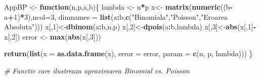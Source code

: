 \documentclass[]{article}
\newenvironment{Shaded}{\begin{snugshade}}{\end{snugshade}}
\newcommand{\KeywordTok}[1]{\textcolor[rgb]{0.13,0.29,0.53}{\textbf{#1}}}
\newcommand{\DataTypeTok}[1]{\textcolor[rgb]{0.13,0.29,0.53}{#1}}
\newcommand{\DecValTok}[1]{\textcolor[rgb]{0.00,0.00,0.81}{#1}}
\newcommand{\StringTok}[1]{\textcolor[rgb]{0.31,0.60,0.02}{#1}}
\newcommand{\CommentTok}[1]{\textcolor[rgb]{0.56,0.35,0.01}{\textit{#1}}}
\newcommand{\ControlFlowTok}[1]{\textcolor[rgb]{0.13,0.29,0.53}{\textbf{#1}}}
\newcommand{\OperatorTok}[1]{\textcolor[rgb]{0.81,0.36,0.00}{\textbf{#1}}}
\newcommand{\NormalTok}[1]{#1}
\begin{document}
\begin{Shaded}
\begin{Highlighting}[]
\NormalTok{AppBP <-}\StringTok{ }\ControlFlowTok{function}\NormalTok{(n,p,a,b)\{}
\NormalTok{    lambda <-}\StringTok{ }\NormalTok{n}\OperatorTok{*}\NormalTok{p}
\NormalTok{    x<-}\StringTok{ }\KeywordTok{matrix}\NormalTok{(}\KeywordTok{numeric}\NormalTok{((b}\OperatorTok{-}\NormalTok{a}\OperatorTok{+}\DecValTok{1}\NormalTok{)}\OperatorTok{*}\DecValTok{3}\NormalTok{),}\DataTypeTok{ncol=}\DecValTok{3}\NormalTok{,}
               \DataTypeTok{dimnames =} \KeywordTok{list}\NormalTok{(a}\OperatorTok{:}\NormalTok{b,}\KeywordTok{c}\NormalTok{(}\StringTok{"Binomiala"}\NormalTok{,}\StringTok{"Poisson"}\NormalTok{,}\StringTok{"Eroarea Absoluta"}\NormalTok{)))}
\NormalTok{    x[,}\DecValTok{1}\NormalTok{]<-}\KeywordTok{dbinom}\NormalTok{(a}\OperatorTok{:}\NormalTok{b,n,p)}
\NormalTok{    x[,}\DecValTok{2}\NormalTok{]<-}\KeywordTok{dpois}\NormalTok{(a}\OperatorTok{:}\NormalTok{b,lambda)}
\NormalTok{    x[,}\DecValTok{3}\NormalTok{]<-}\KeywordTok{abs}\NormalTok{(x[,}\DecValTok{1}\NormalTok{]}\OperatorTok{-}\NormalTok{x[,}\DecValTok{2}\NormalTok{])}
\NormalTok{    error <-}\StringTok{ }\KeywordTok{max}\NormalTok{(}\KeywordTok{abs}\NormalTok{(x[,}\DecValTok{3}\NormalTok{]))}
    
    \KeywordTok{return}\NormalTok{(}\KeywordTok{list}\NormalTok{(}\DataTypeTok{x =} \KeywordTok{as.data.frame}\NormalTok{(x), }\DataTypeTok{error =}\NormalTok{ error, }\DataTypeTok{param =} \KeywordTok{c}\NormalTok{(n, p, lambda)))}
\NormalTok{\}}

\CommentTok{# Functie care ilustreaza aproximarea Binomial vs. Poisson}


\end{Highlighting}
\end{Shaded}
\end{document}
